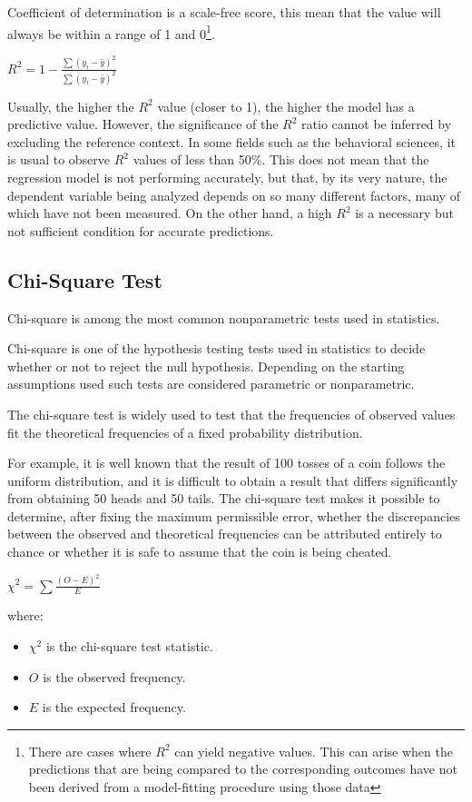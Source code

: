 \documentclass{article}
\begin{document}
Coefficient of determination is a scale-free score, this mean that the value will always be within a range of 1 and 0\footnote{There are cases where $R^2$ can yield negative values. This can arise when the predictions that are being compared to the corresponding outcomes have not been derived from a model-fitting procedure using those data}. 

$ \displaystyle R^2 = 1 - \frac{\sum(y_i - \hat{y})^2}{\sum(y_i - \bar{y})^2}$

Usually, the higher the $R^2$ value (closer to 1), the higher the model has a predictive value. However, the significance of the $R^2$ ratio cannot be inferred by excluding the reference context. In some fields such as the behavioral sciences, it is usual to observe $R^2$ values of less than 50\%. This does not mean that the regression model is not performing accurately, but that, by its very nature, the dependent variable being analyzed depends on so many different factors, many of which have not been measured. 
On the other hand, a high $R^2$ is a necessary but not sufficient condition for accurate predictions.

\subsection{Chi-Square Test}
Chi-square is among the most common nonparametric tests used in statistics.  

Chi-square is one of the hypothesis testing tests used in statistics to decide whether or not to reject the null hypothesis. 
Depending on the starting assumptions used such tests are considered parametric or nonparametric.

The chi-square test is widely used to test that the frequencies of observed values fit the theoretical frequencies of a fixed probability distribution. 

For example, it is well known that the result of 100 tosses of a coin follows the uniform distribution, and it is difficult to obtain a result that differs significantly from obtaining 50 heads and 50 tails. The chi-square test makes it possible to determine, after fixing the maximum permissible error, whether the discrepancies between the observed and theoretical frequencies can be attributed entirely to chance or whether it is safe to assume that the coin is being cheated.

$\displaystyle \chi^2 = \sum \frac{(O - E)^2}{E}$

where: 
\begin{itemize}
    \item $\chi^2$ is the chi-square test statistic.
    \item $O$ is the observed frequency.
    \item $E$ is the expected frequency.
\end{itemize}
\end{document}
